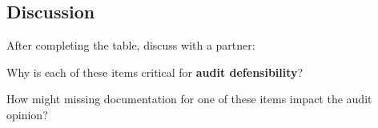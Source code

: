 \documentclass[12pt,a4paper]{memoir}
\begin{document}

\subsection*{Discussion}
After completing the table, discuss with a partner:
\begin{compactitem}
    \item Why is each of these items critical for \textbf{audit defensibility}?
    \item How might missing documentation for one of these items impact the audit opinion?
\end{compactitem}
\end{document}
